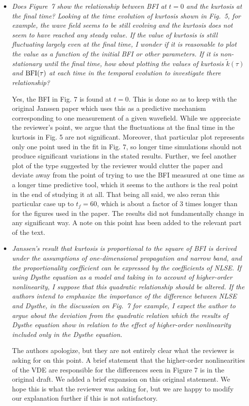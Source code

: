 \documentclass[a4paper,11pt]{article}
\begin{document}
\begin{itemize}
\item {\it Does Figure~7 show the relationship between BFI at $t=0$ and the kurtosis at the final time?
Looking at the time evolution of kurtosis shown in Fig.~5, for example, the wave field seems to be still evolving
and the kurtosis does not seem to have reached any steady value.
If the value of kurtosis is still fluctuating largely even at the final time,
I wonder if it is reasonable to plot the value as a function of the initial BFI or other parameters.
If it is non-stationary until the final time,
how about plotting the values of kurtosis $\tilde{k}(\tau)$ and ${\rm BFI}(\tau)$ at each time in the temporal evolution
to investigate there relationship?}

Yes, the BFI in Fig. 7 is found at $t=0$.  This is done so as to keep with the original Janssen paper which uses this as a predictive mechanism corresponding to one measurement of a given wavefield.  While we appreciate the reviewer's point, we argue that the fluctuations at the final time in the kurtosis in Fig. 5 are not significant.  Moreover, that particular plot represents only one point used in the fit in Fig. 7, so longer time simulations should not produce significant variations in the stated results.  Further, we feel another plot of the type suggested by the reviewer would clutter the paper and deviate away from the point of trying to use the BFI measured at one time as a longer time predictive tool, which it seems to the authors is the real point in the end of studying it at all.  That being all said, we also reran this particular case up to $t_{f}=60$, which is about a factor of 3 times longer than for the figures used in the paper.  The results did not fundamentally change in any significant way.  A note on this point has been added to the relevant part of the text.  

\item {\it Janssen's result that kurtosis is proportional to the square of BFI is derived under the assumptions of one-dimensional
propagation and narrow band, and the proportionality coefficient can be expressed by the coefficients of NLSE.
If using Dysthe equation as a model and taking in to account of higher-order nonlinearity, I suppose that this quadratic relationship should be altered.
If the authors intend to emphasize the importance of the difference between NLSE and Dysthe, in the discussion on Fig.~7 for example,
I expect the author to argue about the deviation from the quadratic relation which the results of Dysthe equation show in relation
to the effect of higher-order nonlinearity included only in the Dysthe equation.}

The authors apologize, but they are not entirely clear what the reviewer is asking for on this point.  A brief statement that the higher-order nonlinearities of the VDE are responsible for the differences seen in Figure 7 is in the original draft.  We added a brief expansion on this original statement.  We hope this is what the reviewer was asking for, but we are happy to modify our explanation further if this is not satisfactory.  
\end{itemize}
\end{document}
